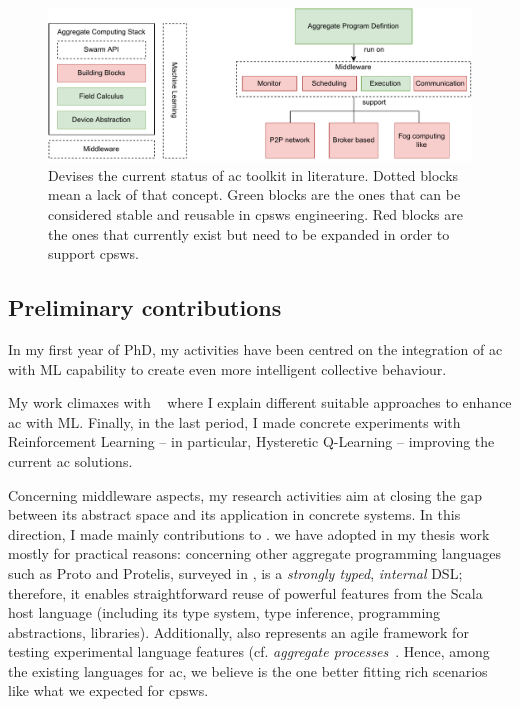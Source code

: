 \documentclass[11pt]{article}
\begin{document}
\begin{figure}[t]
	\centering
	\includegraphics[width=\textwidth]{img/to-do-for-thesis.pdf}
	\caption{Devises the current status of \ac{ac} toolkit in literature. Dotted blocks mean a lack of that concept. Green blocks are the ones that can be considered stable and reusable in \acp{cpsw} engineering. Red blocks are the ones that currently exist but need to be expanded in order to support \acp{cpsw}.}
	\label{fig:current-state}
\end{figure}
\subsection{Preliminary contributions}
In my first year of PhD, my activities have been centred on
the integration of \ac{ac} with ML capability to create even more
intelligent collective behaviour. 

My work climaxes with ~\cite{research} where I explain different suitable approaches to
enhance \ac{ac} with ML. Finally, in the last period, I made concrete
experiments with Reinforcement Learning -- in particular, Hysteretic Q-Learning \cite{hysteretic-q} -- improving the current \ac{ac} solutions.

Concerning middleware aspects, my research activities aim at closing the gap between
its abstract space and its application in concrete systems. In this direction, I made mainly contributions to \scafi.
%
we have adopted \scafi{} in my thesis work mostly for practical reasons: concerning other aggregate programming languages such as Proto and Protelis, surveyed in \cite{viroli2019jlamp-si-coord},
%
\scafi{} is a \emph{strongly typed}, \emph{internal} DSL; therefore, it enables straightforward reuse of powerful features from the Scala host language (including its type system, type inference, programming abstractions, libraries).
%
Additionally, \scafi{} also represents an agile framework for testing experimental language features (cf. \emph{aggregate processes}~\cite{DBLP:journals/eaai/CasadeiVAPD21}.
%
Hence, among the existing languages for \ac{ac}, we believe \scafi{} is the one better fitting rich scenarios like what we expected for \acp{cpsw}.
\end{document}
